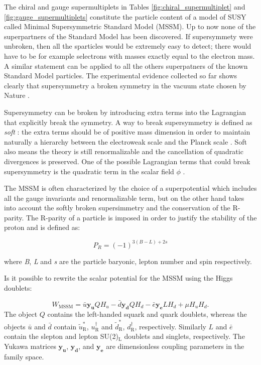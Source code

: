 The chiral and gauge supermultiplets in Tables \ref{fig:chiral_supermultiplet} and \ref{fig:gauge_supermultiplets} constitute the particle content of a model of SUSY called Minimal Supersymmetric Standard Model (MSSM). Up to now none of the superpartners of the Standard Model has been discovered. If supersymmety were unbroken, then all the sparticles would be extremely easy to detect; there would have to be for example selectrons with masses exactly equal to the electron mass. A similar statement can be applied to all the others superpatners of the known Standard Model particles. The experimental evidence collected so far shows clearly that supersymmetry a broken symmetry in the vacuum state chosen by Nature \cite{Martin:1997ns}.

Supersymmetry can be broken by introducing extra terms into the Lagrangian that explicitly break the symmetry. A way to break supersymmetry is defined as \textit{soft} \cite{Dimopoulos:1981zb}: the extra terms should be of positive mass dimension in order to maintain naturally a hierarchy between the electroweak scale and the Planck scale \cite{Martin:1997ns}. Soft also means the theory is still renormalizable and the cancellation of quadratic divergences is preserved. One of the possible Lagrangian terms that could break supersymmetry is the quadratic term in the scalar field $\phi$ \cite{Martin:1997ns}.

The MSSM is often characterized by the choice of a superpotential which includes all the gauge invariants and renormalizable term, but on the other hand takes into account the softly broken supersimmetry and the conservation of the R-parity. The R-parity of a particle is imposed in order to justify the stability of the proton \cite{Martin:1997ns} and is defined as:

\begin{equation}
P_{R} = (-1)^{3(B-L)+2s}
\end{equation}

where \textit{B}, \textit{L} and \textit{s} are the particle baryonic,  lepton number and spin respectively. 

Is it possible to rewrite the scalar potential for the MSSM using the Higgs doublets\cite{Martin:1997ns}:

\begin{equation}
W_{\mathrm{MSSM}} = \bar{u}\mathbf{y_u}QH_u - \bar{d}\mathbf{y_d}QH_d - \bar{e}\mathbf{y_e}LH_d + \mu H_uH_d.
\label{eq::mssmpotential}
\end{equation}
The object $Q$ contains the left-handed squark and quark doublets, whereas the objects $\bar{u}$ and $\bar{d}$ contain $\widetilde{u}^*_{\text{R}}$, ${u}^\dag_{\text{R}}$ and $\widetilde{d}^*_{\text{R}}$, ${d}^\dag_{\text{R}}$, respectively. Similarly $L$ and $\bar{e}$ contain the slepton and lepton SU(2)$_{\mathrm{L}}$ doublets and singlets, respectively. The Yukawa matrices $\mathbf{y_u}$, $\mathbf{y_d}$, and $\mathbf{y_e}$ are dimensionless coupling parameters in the family space.

